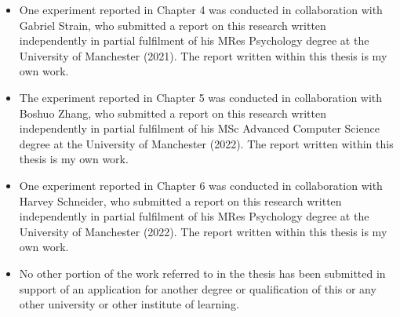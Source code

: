 \begin{itemize} 
\item One experiment reported in Chapter 4 was conducted in collaboration with Gabriel Strain, who submitted a report on this research written independently in partial fulfilment of his MRes Psychology degree at the University of Manchester (2021). The report written within this thesis is my own work.
\item The experiment reported in Chapter 5 was conducted in collaboration with Boshuo Zhang, who submitted a report on this research written independently in partial fulfilment of his MSc Advanced Computer Science degree at the University of Manchester (2022). The report written within this thesis is my own work.
\item One experiment reported in Chapter 6 was conducted in collaboration with Harvey Schneider, who submitted a report on this research written independently in partial fulfilment of his MRes Psychology degree at the University of Manchester (2022). The report written within this thesis is my own work.
\item No other portion of the work referred to in the thesis has been submitted in support of an application for another degree or qualification of this or any other university or other institute of learning.\\
\end{itemize} 